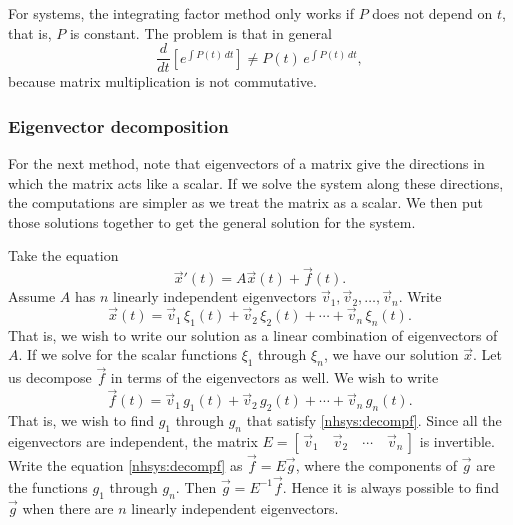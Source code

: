 For systems, the integrating factor method
only works if $P$ does not depend on $t$, that is,
$P$ is constant.  The
problem is that in general
\begin{equation*}
\frac{d}{dt} \left[ e^{\int P(t)\,dt} \right] \neq P(t) \, e^{\int P(t)\,dt} ,
\end{equation*}
because matrix multiplication is not commutative.

\subsubsection{Eigenvector decomposition}

For the next method, note that eigenvectors of a matrix give the 
directions in which the matrix acts like a scalar.  If we solve
the system along these directions, the computations are simpler as we
treat the matrix as a scalar.  We then
put those solutions together to get the general solution
for the system.

Take the equation
\begin{equation} \label{nhsys:ednhsys}
{\vec{x}}' (t) = A \vec{x}(t) + \vec{f}(t) .
\end{equation}
Assume $A$ has $n$ linearly independent eigenvectors
$\vec{v}_1, \vec{v}_2, \ldots, \vec{v}_n$.  Write
\begin{equation} \label{nhsys:decompx}
\vec{x}(t) =
\vec{v}_1 \, \xi_1(t) + 
\vec{v}_2 \, \xi_2(t) + \cdots +
\vec{v}_n \, \xi_n(t) .
\end{equation}
That is, we wish to write our solution as a linear combination of
eigenvectors of $A$.
If we solve for the scalar functions $\xi_1$ through $\xi_n$, we have
our solution $\vec{x}$.
Let us decompose $\vec{f}$ in terms of the eigenvectors as well.  We wish to write
\begin{equation} \label{nhsys:decompf}
\vec{f}(t) =
\vec{v}_1 \, g_1(t) + 
\vec{v}_2 \, g_2(t) + \cdots +
\vec{v}_n \, g_n(t) .
\end{equation}
That is, we wish to find $g_1$ through $g_n$ that satisfy
\eqref{nhsys:decompf}.  Since all the eigenvectors
are independent, the matrix
$E = [\, \vec{v}_1 \quad \vec{v}_2 \quad \cdots \quad \vec{v}_n \,]$
is invertible.  Write the equation \eqref{nhsys:decompf}
as $\vec{f} = E \vec{g}$, where the components of
$\vec{g}$ are the functions $g_1$ through $g_n$.
Then $\vec{g} = E^{-1} \vec{f}$.
Hence it is always possible to find $\vec{g}$ when there
are $n$ linearly independent eigenvectors.

